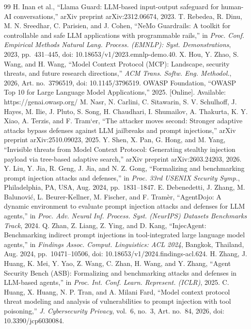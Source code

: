 \documentclass[journal]{IEEEtran}
\theoremstyle{remark}
\begin{document}
\begin{thebibliography}{99}
 H. Inan et al., ``Llama Guard: LLM-based input-output safeguard for human-AI conversations,'' arXiv preprint arXiv:2312.06674, 2023.
 T. Rebedea, R. Dinu, M. N. Sreedhar, C. Parisien, and J. Cohen, ``NeMo Guardrails: A toolkit for controllable and safe LLM applications with programmable rails,'' in \emph{Proc. Conf. Empirical Methods Natural Lang. Process. (EMNLP): Syst. Demonstrations}, 2023, pp.~431--445, doi: 10.18653/v1/2023.emnlp-demo.40.
 X. Hou, Y. Zhao, S. Wang, and H. Wang, ``Model Context Protocol (MCP): Landscape, security threats, and future research directions,'' \emph{ACM Trans. Softw. Eng. Methodol.}, 2026, Art. no.~3796519, doi: 10.1145/3796519.
 OWASP Foundation, ``OWASP Top 10 for Large Language Model Applications,'' 2025. [Online]. Available: https://genai.owasp.org/
 M. Nasr, N. Carlini, C. Sitawarin, S. V. Schulhoff, J. Hayes, M. Ilie, J. Pluto, S. Song, H. Chaudhari, I. Shumailov, A. Thakurta, K. Y. Xiao, A. Terzis, and F. Tram`{e}r, ``The attacker moves second: Stronger adaptive attacks bypass defenses against LLM jailbreaks and prompt injections,'' arXiv preprint arXiv:2510.09023, 2025.
 Y. Shen, X. Pan, G. Hong, and M. Yang, ``Invisible threats from Model Context Protocol: Generating stealthy injection payload via tree-based adaptive search,'' arXiv preprint arXiv:2603.24203, 2026.
 Y. Liu, Y. Jia, R. Geng, J. Jia, and N. Z. Gong, ``Formalizing and benchmarking prompt injection attacks and defenses,'' in \emph{Proc. 33rd USENIX Security Symp.}, Philadelphia, PA, USA, Aug. 2024, pp.~1831--1847.
 E. Debenedetti, J. Zhang, M. Balunovi\'{c}, L. Beurer-Kellner, M. Fischer, and F. Tram\`{e}r, ``AgentDojo: A dynamic environment to evaluate prompt injection attacks and defenses for LLM agents,'' in \emph{Proc. Adv. Neural Inf. Process. Syst. (NeurIPS) Datasets Benchmarks Track}, 2024.
 Q. Zhan, Z. Liang, Z. Ying, and D. Kang, ``InjecAgent: Benchmarking indirect prompt injections in tool-integrated large language model agents,'' in \emph{Findings Assoc. Comput. Linguistics: ACL 2024}, Bangkok, Thailand, Aug. 2024, pp.~10471--10506, doi: 10.18653/v1/2024.findings-acl.624.
 H. Zhang, J. Huang, K. Mei, Y. Yao, Z. Wang, C. Zhan, H. Wang, and Y. Zhang, ``Agent Security Bench (ASB): Formalizing and benchmarking attacks and defenses in LLM-based agents,'' in \emph{Proc. Int. Conf. Learn. Represent. (ICLR)}, 2025.
 C. Huang, X. Huang, N. P. Tran, and A. Milani Fard, ``Model context protocol threat modeling and analysis of vulnerabilities to prompt injection with tool poisoning,'' \emph{J. Cybersecurity Privacy}, vol.~6, no.~3, Art. no.~84, 2026, doi: 10.3390/jcp6030084.

\end{thebibliography}
\end{document}
